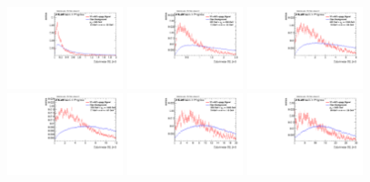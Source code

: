 \begin{figure}[H]
\bigskip
\includegraphics[width=0.3\textwidth]{sascha_input/Appendix/Distributions/w/distributions/beta3/h_recoJet_D2_3_bin1.pdf} \hspace{1mm}
\includegraphics[width=0.3\textwidth]{sascha_input/Appendix/Distributions/w/distributions/beta3/h_recoJet_D2_3_bin2.pdf} \hspace{1mm}
\includegraphics[width=0.3\textwidth]{sascha_input/Appendix/Distributions/w/distributions/beta3/h_recoJet_D2_3_bin3.pdf} 
\bigskip
\includegraphics[width=0.3\textwidth]{sascha_input/Appendix/Distributions/w/distributions/beta3/h_recoJet_D2_3_bin4.pdf} \hspace{1mm}
\includegraphics[width=0.3\textwidth]{sascha_input/Appendix/Distributions/w/distributions/beta3/h_recoJet_D2_3_bin5.pdf} \hspace{1mm}
\includegraphics[width=0.3\textwidth]{sascha_input/Appendix/Distributions/w/distributions/beta3/h_recoJet_D2_3_bin6.pdf}

\end{figure}
